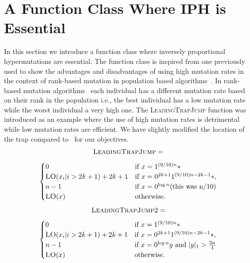 \documentclass[lettersize,journal]{IEEEtran}
\begin{document}
{\color{blue}

\section{A Function Class Where IPH is Essential} 
In this section we introduce a function class where inversely proportional hypermutations are essential.
The function class is inspired from one previously used to show the advantages and disadvantages of using high mutation rates in the context of rank-based mutation in population based algorithms~\cite{OlivetoLehreNeumann09}.
In rank-based mutation algorithms~\cite{RankBasedMutation} each individual has a different mutation rate based on their rank in the population i.e., the best individual has a low mutation rate while the worst individual a very high one.
The \textsc{LeadingTrapJump} function was introduced as an example where the use of high mutation rates is detrimental while low mutation rates are efficient. We have slightly modified the location of the trap compared to~\cite{OlivetoLehreNeumann09} for our objectives.
\[
\textsc{LeadingTrapJump}  =
\]
\[
\begin{cases}
0 & \text{if } x = 1^{(9/10)n}* \\
\textsc{LO}(x_i | i>2k+1) + 2k+1 & \text{if } x = 0^{2k+1}1^{(9/10)n - 2k-1}*, \\
n-1 & \text{if } x = 0^{\log n}  \text{(this was n/10)}\\
\textsc{LO}(x) & \text{otherwise}.
\end{cases}
\]
\[
\textsc{LeadingTrapJump2}  =
\]
\[
\begin{cases}
	0 & \text{if } x = 1^{(9/10)n}* \\
	\textsc{LO}(x_i | i>2k+1) + 2k+1 & \text{if } x = 0^{2k+1}1^{(9/10)n - 2k-1}*, \\
	n-1 & \text{if } x = 0^{\log n}y \text{ and } |y|_1>\frac{3n}{4} \\
	\textsc{LO}(x) & \text{otherwise}.
\end{cases}
\]



}
\end{document}
